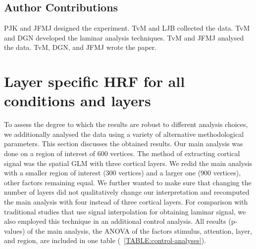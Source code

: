 \documentclass[9pt,lineno]{aperture}
\begin{document}
\subsection{Author Contributions}
PJK and JFMJ designed the experiment. TvM and LJB collected the data. TvM and DGN developed the laminar analysis techniques. TvM and JFMJ analysed the data. TvM, DGN, and JFMJ wrote the paper. 





\appendix
\begin{appendixbox}
\label{first:app}
\section{Layer specific HRF for all conditions and layers}
To assess the degree to which the results are robust to different analysis choices, we additionally analysed the data using a variety of alternative methodological parameters. This section discusses the obtained results. Our main analysis was done on a region of interest of 600 vertices. The method of extracting cortical signal was the spatial GLM \citep{VanMourik2019} with three cortical layers. We redid the main analysis with a smaller region of interest (300 vertices) and a larger one (900 vertices), other factors remaining equal. We further wanted to make sure that changing the number of layers did not qualitatively change our interpretation and recomputed the main analysis with four instead of three cortical layers. For comparison with traditional studies that use signal interpolation for obtaining laminar signal, we also employed this technique in an additional control analysis. All results (p-values) of the main analysis, the ANOVA of the factors stimulus, attention, layer, and region, are included in one table (~\ref{TABLE:control-analyses}).


\end{appendixbox}
\end{document}
